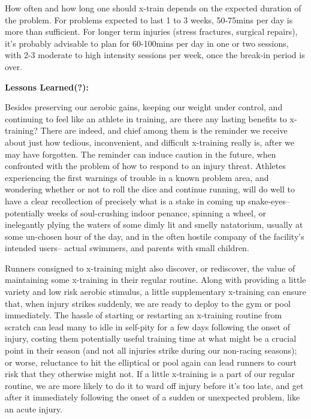 How often and how long one should x-train depends on the expected duration of the problem. For problems expected to last 1 to 3 weeks, 50-75mins per day is more than sufficient. For longer term injuries (stress fractures, surgical repairs), it's probably advisable to plan for 60-100mins per day in one or two sessions, with 2-3 moderate to high intensity sessions per week, once the break-in period is over.

\bigskip

\textbf{Lessons Learned(?):}

Besides preserving our aerobic gains, keeping our weight under control, and continuing to feel like an athlete in training, are there any lasting benefits to x-training? There are indeed, and chief among them is the reminder we receive about just how tedious, inconvenient, and difficult x-training really is, after we may have forgotten. The reminder can induce caution in the future, when confronted with the problem of how to respond to an injury threat. Athletes experiencing the first warnings of trouble in a known problem area, and wondering whether or not to roll the dice and continue running, will do well to have a clear recollection of precisely what is a stake in coming up snake-eyes-- potentially weeks of soul-crushing indoor penance, spinning a wheel, or inelegantly plying the waters of some dimly lit and smelly natatorium, usually at some un-chosen hour of the day, and in the often hostile company of the facility's intended users-- actual swimmers, and parents with small children.

Runners consigned to x-training might also discover, or rediscover, the value of maintaining some x-training in their regular routine. Along with providing a little variety and low risk aerobic stimulus, a little supplementary x-training can ensure that, when injury strikes suddenly, we are ready to deploy to the gym or pool immediately. The hassle of starting or restarting an x-training routine from scratch can lead many to idle in self-pity for a few days following the onset of injury, costing them potentially useful training time at what might be a crucial point in their season (and not all injuries strike during our non-racing seasons); or worse, reluctance to hit the elliptical or pool again can lead runners to court risk that they otherwise might not. If a little x-training is a part of our regular routine, we are more likely to do it to ward off injury before it's too late, and get after it immediately following the onset of a sudden or unexpected problem, like an acute injury.

